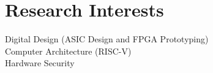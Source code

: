 \section{\sc Research Interests}

Digital Design (ASIC Design and FPGA Prototyping)\\
Computer Architecture (RISC-V) \\
Hardware Security \\
\endinput